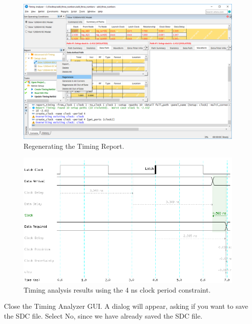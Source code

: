 \documentclass[11pt, twoside, pdftex]{article}
\begin{document}
\begin{figure}[H]
\begin{center}
\includegraphics[scale=0.5]{figures/setconstraint5.png}
\end{center}
\caption{Regenerating the Timing Report.}
\label{fig:setconstraint5}
\end{figure}

\begin{figure}[H]
\begin{center}
\includegraphics[scale=0.65]{figures/SB8.png}
\end{center}
\caption{Timing analysis results using the 4 ns clock period constraint.}
\label{fig:SB8}
\end{figure}

Close the Timing Analyzer GUI. A dialog will appear, asking if you want to save the SDC file.
Select {\sf No}, since we have already saved the SDC file.
\end{document}
